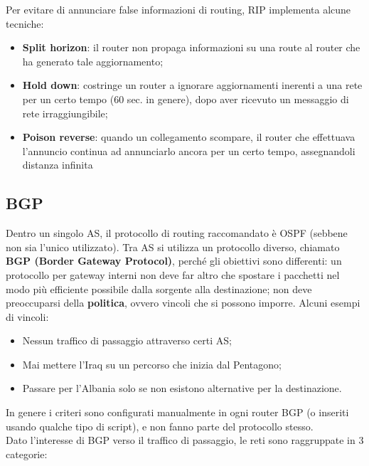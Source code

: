 \documentclass{article}
\begin{document}
        Per evitare di annunciare false informazioni di routing, RIP implementa alcune tecniche:

            \begin{itemize}
                \item \textbf{Split horizon}: il router non propaga informazioni su una route al router che ha generato
                tale aggiornamento;
                \item \textbf{Hold down}: costringe un router a ignorare aggiornamenti inerenti a una rete per un
                certo tempo (60 sec. in genere), dopo aver ricevuto un messaggio di rete irraggiungibile;
                \item \textbf{Poison reverse}: quando un collegamento scompare, il router che effettuava l’annuncio
                continua ad annunciarlo ancora per un certo tempo, assegnandoli distanza infinita
            \end{itemize}

        \subsection{BGP}
        Dentro un singolo AS, il protocollo di routing raccomandato è OSPF (sebbene non sia l’unico
        utilizzato). Tra AS si utilizza un protocollo diverso, chiamato \textbf{BGP (Border Gateway Protocol)},
        perché gli obiettivi sono differenti: un protocollo per gateway interni non deve far altro che
        spostare i pacchetti nel modo più efficiente possibile dalla sorgente alla destinazione; non deve
        preoccuparsi della \textbf{politica}, ovvero vincoli che si possono imporre. Alcuni esempi di vincoli:
        
            \begin{itemize}
                \item Nessun traffico di passaggio attraverso certi AS;
                \item Mai mettere l’Iraq su un percorso che inizia dal Pentagono;
                \item Passare per l’Albania solo se non esistono alternative per la destinazione.
            \end{itemize}

        In genere i criteri sono configurati manualmente in ogni router BGP (o inseriti usando qualche
        tipo di script), e non fanno parte del protocollo stesso.\\

        Dato l’interesse di BGP verso il traffico di passaggio, le reti sono raggruppate in 3 categorie:
\end{document}
